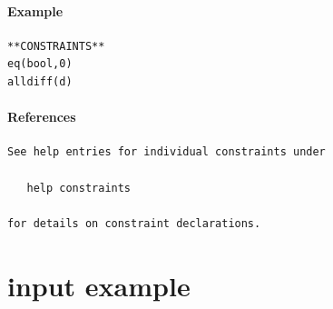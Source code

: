 \documentclass[oneside]{book}
\begin{document}
\paragraph{Example}
{\footnotesize
\begin{verbatim}
**CONSTRAINTS**
eq(bool,0)
alldiff(d)
\end{verbatim}
}
\paragraph{References}
{\footnotesize
\begin{verbatim}
See help entries for individual constraints under

   help constraints

for details on constraint declarations.
\end{verbatim}
}
\section{input example}
\end{document}
